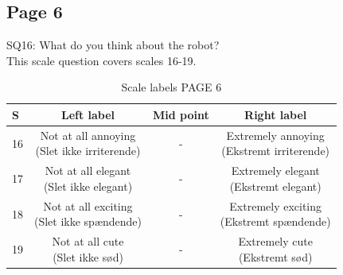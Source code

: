 \subsection{Page 6}
\noindent
SQ16: What do you think about the robot?\\%
This scale question covers scales 16-19. 
%
\begin{table}[H]
	\centering
\caption{Scale labels PAGE 6}
	\label{tab:ScalesPage6} 
	\begin{tabular}{l|c|c|c}
		S     & Left label & Mid point & Right label \\\hline
		16   & \makecell{Not at all annoying\\(Slet ikke irriterende)}  & - & \makecell{Extremely annoying \\(Ekstremt irriterende)}        \\\hline
		17   & \makecell{Not at all elegant \\(Slet ikke elegant)} & - & \makecell{Extremely elegant \\(Ekstremt elegant)}         \\\hline
		18   & \makecell{Not at all exciting\\(Slet ikke spændende)} & - & \makecell{Extremely exciting \\(Ekstremt spændende)}         \\\hline
	 	19   & \makecell{Not at all cute\\(Slet ikke sød)} & - & \makecell{Extremely cute \\(Ekstremt sød)}               
	\end{tabular}        
\end{table}
\noindent
%
